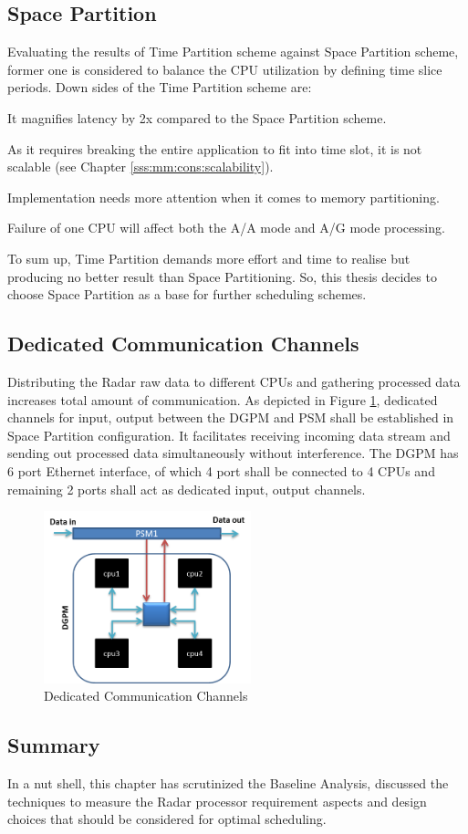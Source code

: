 \subsection{Space Partition}
Evaluating the results of Time Partition scheme against Space Partition scheme, former one is considered to balance the CPU utilization by defining time slice periods. Down sides of the Time Partition scheme are:
\begin{compactitem} 
\item It magnifies latency by 2x compared to the Space Partition scheme.
\item As it requires breaking the entire application to fit into time slot, it is not scalable (see Chapter \ref{sss:mm:cons:scalability}).
\item Implementation needs more attention when it comes to memory partitioning.
\item Failure of one CPU will affect both the A/A mode and A/G mode processing.
\end{compactitem} 
\vspace*{0.2cm}
To sum up, Time Partition demands more effort and time to realise but producing no better result than Space Partitioning. So, this thesis decides to choose Space Partition as a base for further scheduling schemes.

\subsection{Dedicated Communication Channels}
Distributing the Radar raw data to different CPUs and gathering processed data increases total amount of communication. As depicted in Figure \ref{fig:mm:dedicated_channels}, dedicated channels for input, output between the DGPM and PSM shall be established in Space Partition configuration. It facilitates receiving incoming data stream and sending out processed data simultaneously without interference. The DGPM has 6 port Ethernet interface, of which 4 port shall be connected to 4 CPUs and remaining 2 ports shall act as dedicated input, output channels.

\begin{figure}[h!]
	\centering
	\includegraphics[width=60mm]{figures/dedicated_channels}
	\caption{Dedicated Communication Channels}
	\label{fig:mm:dedicated_channels}
\end{figure}

\subsection{Summary}
In a nut shell, this chapter has scrutinized the Baseline Analysis, discussed the techniques to measure the Radar processor requirement aspects and design choices that should be considered for optimal scheduling.

